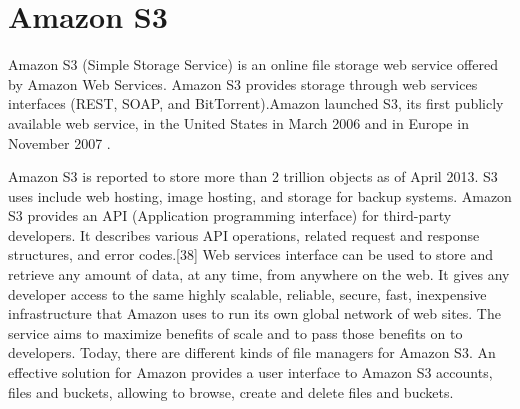 \section{Amazon S3}
\label{sec:s3_s3}

Amazon S3 (Simple Storage Service) is an online file storage web service offered by Amazon Web Services. Amazon S3 provides storage through web services interfaces (REST, SOAP, and BitTorrent).Amazon launched S3, its first publicly available web service, in the United States in March 2006 and in Europe in November 2007 \cite{s3_overview}.

Amazon S3 is reported to store more than 2 trillion objects as of April 2013.\cite{s3_stats} S3 uses include web hosting, image hosting, and storage for backup systems. 
Amazon S3 provides an API (Application programming interface) for third-party developers. It describes various API operations, related request and response structures, and error codes.[38] Web services interface can be used to store and retrieve any amount of data, at any time, from anywhere on the web. It gives any developer access to the same highly scalable, reliable, secure, fast, inexpensive infrastructure that Amazon uses to run its own global network of web sites. The service aims to maximize benefits of scale and to pass those benefits on to developers. Today, there are different kinds of file managers for Amazon S3. An effective solution for Amazon provides a user interface to Amazon S3 accounts, files and buckets, allowing to browse, create and delete files and buckets.
